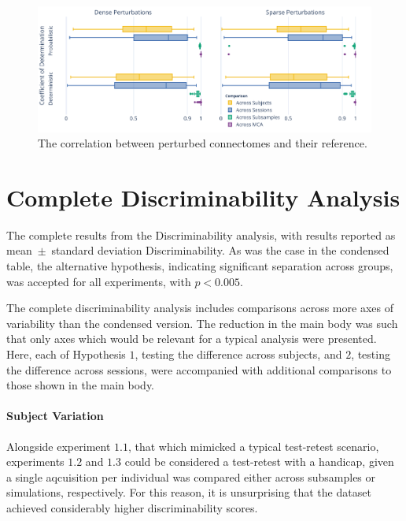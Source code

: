 \documentclass[fleqn,10pt]{SelfArx} %
\begin{document}
\begin{figure}[ht]\centering
\includegraphics[width=\linewidth]{figures/figS1_correlation_differences.pdf}
\caption{The correlation between perturbed connectomes and their reference.}
\label{fig:correlation}
\end{figure}

\clearpage
\section{Complete Discriminability Analysis}
\label{supsec:discrimfull}

\begin{table}[ht]\centering
\caption{The complete results from the Discriminability analysis, with results reported as mean~$\pm$~standard
deviation Discriminability. As was the case in the condensed table, the alternative hypothesis, indicating significant
separation across groups, was accepted for all experiments, with $p < 0.005$.}
\vspace{5pt}

\label{stab:discrim_full}
\end{table}

The complete discriminability analysis includes comparisons across more axes of variability than the condensed version.
The reduction in the main body was such that only axes which would be relevant for a typical analysis were presented.
Here, each of Hypothesis $1$, testing the difference across subjects, and $2$, testing the difference across sessions,
were accompanied with additional comparisons to those shown in the main body.

\paragraph{Subject Variation}
Alongside experiment $1.1$, that which mimicked a typical test-retest scenario, experiments $1.2$ and $1.3$ could be
considered a test-retest with a handicap, given a single aqcuisition per individual was compared either across
subsamples or simulations, respectively. For this reason, it is unsurprising that the dataset achieved considerably
higher discriminability scores. 
\end{document}
